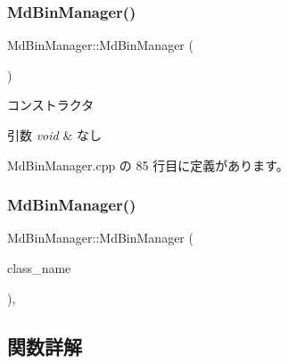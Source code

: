 \subsubsection{\texorpdfstring{Md\+Bin\+Manager()}{MdBinManager()}\hspace{0.1cm}{\footnotesize\ttfamily [1/2]}}
{\footnotesize\ttfamily Md\+Bin\+Manager\+::\+Md\+Bin\+Manager (\begin{DoxyParamCaption}{ }\end{DoxyParamCaption})\hspace{0.3cm}{\ttfamily [private]}}



コンストラクタ 


\begin{DoxyParams}{引数}
{\em void} & なし \\
\hline
\end{DoxyParams}


 Md\+Bin\+Manager.\+cpp の 85 行目に定義があります。

\mbox{\label{class_md_bin_manager_a95626ea9eb89f46cd069a3edf03b0885}} 
\subsubsection{\texorpdfstring{Md\+Bin\+Manager()}{MdBinManager()}\hspace{0.1cm}{\footnotesize\ttfamily [2/2]}}
{\footnotesize\ttfamily Md\+Bin\+Manager\+::\+Md\+Bin\+Manager (\begin{DoxyParamCaption}\item[{const \mbox{\hyperlink{class_md_bin_manager}{Md\+Bin\+Manager}} \&}]{class\+\_\+name }\end{DoxyParamCaption})\hspace{0.3cm}{\ttfamily [private]}, {\ttfamily [delete]}}



\subsection{関数詳解}
\mbox{\label{class_md_bin_manager_a435f89bb7839d6eb67c7b24f3190d76c}} 
